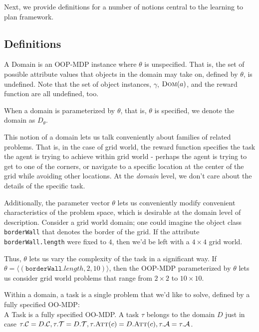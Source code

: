 \documentclass[11pt]{article}
\begin{document}
Next, we provide definitions for a number of notions central to the learning to plan framework.

\subsection{Definitions}

{ A \textup{Domain} is an OOP-MDP instance where $\theta$ is unspecified. That is, the set of possible attribute values that objects in the domain may take on, defined by $\theta$, is undefined. Note that the set of object instances, $\gamma$, $\textsc{Dom}(a)$, and the reward function are all undefined, too.}

When a domain is parameterized by $\theta$, that is, $\theta$ is specified, we denote the domain as $D_\theta$.

This notion of a domain lets us talk conveniently about families of related problems. That is, in the case of grid world, the reward function specifies the task the agent is trying to achieve within grid world - perhaps the agent is trying to get to one of the corners, or navigate to a specific location at the center of the grid while avoiding other locations. At the {\it domain} level, we don't care about the details of the specific task.

Additionally, the parameter vector $\theta$ lets us conveniently modify convenient characteristics of the problem space, which is desirable at the domain level of description. Consider a grid world domain; one could imagine the object class \texttt{borderWall} that denotes the border of the grid. If the attribute \texttt{borderWall.length} were fixed to $4$, then we'd be left with a $4\times4$ grid world.

Thus, $\theta$ lets us vary the complexity of the task in a significant way. If $\theta = \langle (\texttt{borderWall}.length,2,10) \rangle$, then the OOP-MDP parameterized by $\theta$ lets us consider grid world problems that range from $2\times2$ to $10\times10$.

Within a domain, a task is a single problem that we'd like to solve, defined by a fully specified OO-MDP: \\

{ A \textup{Task} is a fully specified OO-MDP. A task $\tau$ belongs to the domain $D$ just in case $\tau.\mathcal{C} = D.\mathcal{C}, \tau.\mathcal{T} = D.\mathcal{T}, \tau.\textsc{Att}(c) = D.\textsc{Att}(c), \tau.\mathcal{A} = \tau.\mathcal{A}$}.
\end{document}
